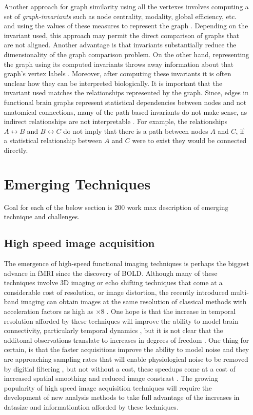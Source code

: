 Another approach for graph similarity using all the vertexes involves computing a set of \emph{graph-invariants} such as node centrality, modality, global efficiency, etc. and using the values of these measures to represent the graph \cite{rubinov}\cite{bullmoreReview}. Depending on the invariant used, this approach may permit the direct comparison of graphs that are not aligned. Another advantage is that invariants substantially reduce the dimensionality of the graph comparison problem. On the other hand, representing the graph using its computed invariants throws away information about that graph's vertex labels \cite{Vogelstein2012}. Moreover, after computing these invariants it is often unclear how they can be interpreted biologically. It is important that the invariant used matches the relationships represented by the graph. Since, edges in functional brain graphs represent statistical dependencies between nodes and not anatomical connections, many of the path based invariants do not make sense, as indirect relationships are not interpretable \cite{}. For example, the relationships $A \leftrightarrow B$ and $B \leftrightarrow C$ do not imply that there is a path between nodes $A$ and $C$, if a statistical relationship between $A$ and $C$ were to exist they would be connected directly.   

\section{Emerging Techniques}

Goal for each of the below section is 200 work max description of emerging technique and challenges.

\subsection{High speed image acquisition}

The emergence of high-speed functional imaging techniques is perhaps the biggest advance in fMRI since the discovery of BOLD. Although many of these techniques involve 3D imaging \cite{glover, MRNguy} or echo shifting techniques \cite{PRESTO} that come at a considerable cost of resolution, or image distortion, the recently introduced multi-band imaging can obtain images at the same resolution of classical methods with acceleration factors as high as $\times8$ \cite{Feinberg}. One hope is that the increase in temporal resolution afforded by these techniques will improve the ability to model brain connectivity, particularly temporal dynamics \cite{smithTICA}, but it is not clear that the additonal observations translate to increases in degrees of freedom \cite{MRNguy}. One thing for certain, is that the faster acquisitions improve the ability to model noise and they are approaching sampling rates that will enable physiological noise to be removed by digitial filtering \cite{beckmann}, but not without a cost, these speedups come at a cost of increased spatial smoothing and reduced image constrast \cite{needfind}. The growing popularity of high speed image acquisition techniques will require the development of new analysis methods to take full advantage of the increases in datasize and informationtion afforded by these techniques.

